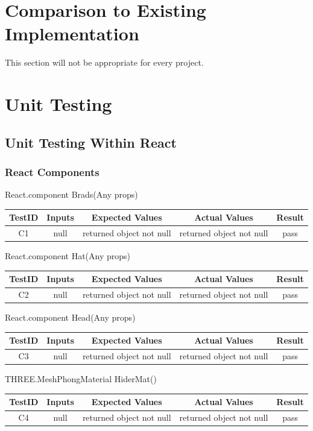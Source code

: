 \documentclass[12pt, titlepage]{article}
\begin{document}
\section{Comparison to Existing Implementation}	

This section will not be appropriate for every project.

\section{Unit Testing}
\subsection{Unit Testing Within React}
\subsubsection{React Components}

React.component Brads(Any props) \\
\begin{tabular}{ |c|c|c|c|c| } 
 \hline
 TestID & Inputs & Expected Values & Actual Values & Result \\ 
 \hline
 C1 & null & returned object not null & returned object not null & pass \\ 
 \hline
\end{tabular}

React.component Hat(Any props) \\
\begin{tabular}{ |c|c|c|c|c| } 
 \hline
 TestID & Inputs & Expected Values & Actual Values & Result \\ 
 \hline
 C2 & null & returned object not null & returned object not null & pass \\ 
 \hline
\end{tabular}

React.component Head(Any props) \\
\begin{tabular}{ |c|c|c|c|c| } 
 \hline
 TestID & Inputs & Expected Values & Actual Values & Result \\ 
 \hline
 C3 & null & returned object not null & returned object not null & pass \\ 
 \hline
\end{tabular}

THREE.MeshPhongMaterial HiderMat() \\
\begin{tabular}{ |c|c|c|c|c| } 
 \hline
 TestID & Inputs & Expected Values & Actual Values & Result \\ 
 \hline
 C4 & null & returned object not null & returned object not null & pass \\ 
 \hline
\end{tabular}
\end{document}
